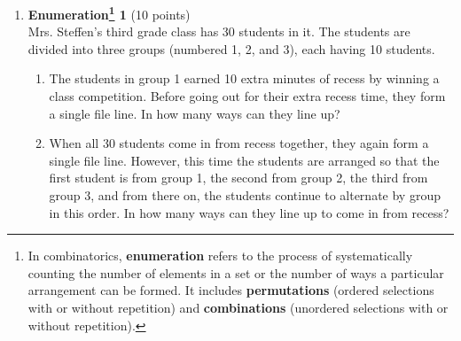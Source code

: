 \begin{enumerate}
  \newpage

  \item \textbf{Enumeration\footnote{In combinatorics, 
  \textbf{enumeration} refers to the process of systematically counting the 
  number of elements in a set or the number of ways a particular arrangement 
  can be formed. It includes \textbf{permutations} (ordered selections with 
  or without repetition) and \textbf{combinations} (unordered selections 
  with or without repetition).} 1} (10 points)\\
  Mrs. Steffen's third grade class has 30 students in it. The students are divided into three groups (numbered 1, 2, and 3), each having 10 students.
  \begin{enumerate}[label=\alph*.]
    \item The students in group 1 earned 10 extra minutes of recess by winning a class competition. Before going out for their extra recess time, they form a single file line. In how many ways can they line up?
    \begin{subanswer}
    \end{subanswer}
    \item When all 30 students come in from recess together, they again form a single file line. However, this time the students are arranged so that the first student is from group 1, the second from group 2, the third from group 3, and from there on, the students continue to alternate by group in this order. In how many ways can they line up to come in from recess?
    \begin{subanswer}
    \end{subanswer}
  \end{enumerate}



\end{enumerate}
